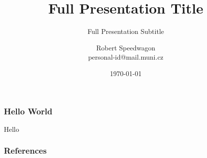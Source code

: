 \documentclass[dvipsnames, aspectratio = 169]{beamer}
\title[Short Presentation Title]{Full Presentation Title}
\subtitle[Short Presentation Subtitle]{Full Presentation Subtitle}
\author[R. Speedwagon]{Robert Speedwagon\texorpdfstring{\\}{, }personal-id@mail.muni.cz}
\institute[MU]{Masaryk University}
\date{\today}
\begin{document}
\begin{frame}
    \maketitle
\end{frame}

\begin{frame}
    \frametitle{Hello World}

    Hello \cite{einstein1905tragheit}

\end{frame}

\begin{frame}[allowframebreaks]
    \frametitle{References}
    
    
\end{frame}
\end{document}
